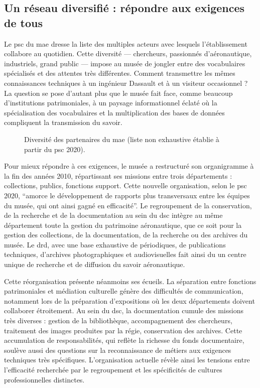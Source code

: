 %

\subsection{Un réseau diversifié : répondre aux exigences de tous}

Le \ac{psc} du \ac{mae} dresse la liste des multiples acteurs avec lesquels l'établissement collabore au quotidien. Cette diversité — chercheurs, passionnés d'aéronautique, industriels, grand public — impose au musée de jongler entre des vocabulaires spécialisés et des attentes très différentes. Comment transmettre les mêmes connaissances techniques à un ingénieur Dassault et à un visiteur occasionnel ? La question se pose d'autant plus que le musée fait face, comme beaucoup d'institutions patrimoniales, à un paysage informationnel éclaté où la spécialisation des vocabulaires et la multiplication des bases de données compliquent la transmission du savoir.

\begin{figure}[htbp]
	
	\caption{Diversité des partenaires du \ac{mae} (liste non exhaustive établie à partir du \ac{psc} 2020).}
	\label{fig:schem_partenaires}
\end{figure}

Pour mieux répondre à ces exigences, le musée a restructuré son organigramme à la fin des années 2010, répartissant ses missions entre trois départements : collections, publics, fonctions support. Cette nouvelle organisation, selon le \ac{psc} 2020, \enquote{amorce le développement de rapports plus transversaux entre les équipes du musée, qui ont ainsi gagné en efficacité}. Le regroupement de la conservation, de la recherche et de la documentation au sein du \ac{dsc} intègre au même département toute la gestion du patrimoine aéronautique, que ce soit pour la gestion des collections, de la documentation, de la recherche  ou des archives du musée. Le \ac{drd}, avec une base exhaustive de périodiques, de publications techniques, d'archives photographiques et audiovisuelles fait ainsi du \mae un centre unique de recherche et de diffusion du savoir aéronautique.

Cette réorganisation présente néanmoins ses écueils. La séparation entre fonctions patrimoniales et médiation culturelle génère des difficultés de communication, notamment lors de la préparation d'expositions où les deux départements doivent collaborer étroitement. Au sein du \ac{dsc}, la documentation cumule des missions très diverses : gestion de la bibliothèque, accompagnement des chercheurs, traitement des images produites par la régie, conservation des archives. Cette accumulation de responsabilités, qui reflète la richesse du fonds documentaire, soulève aussi des questions sur la reconnaissance de métiers aux exigences techniques très spécifiques. L'organisation actuelle révèle ainsi les tensions entre l'efficacité recherchée par le regroupement et les spécificités de cultures professionnelles distinctes.